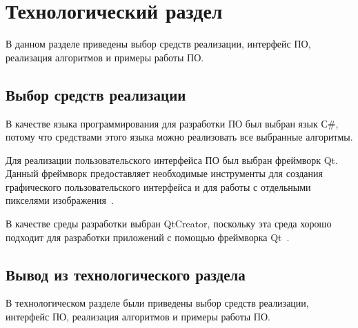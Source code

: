 \chapter{Технологический раздел}
В данном разделе приведены выбор средств реализации, интерфейс ПО, реализация алгоритмов и примеры работы ПО.

\section{Выбор средств реализации}
В качестве языка программирования для разработки ПО был выбран язык С\#, потому что средствами этого языка можно реализовать все выбранные алгоритмы.

Для реализации пользовательского интерфейса ПО был выбран фреймворк Qt. Данный фреймворк предоставляет необходимые инструменты для создания графического пользовательского интерфейса и для работы с отдельными пикселями изображения~\cite{src_qt}.

В качестве среды разработки выбран QtCreator, поскольку эта среда хорошо подходит для разработки приложений с помощью фреймворка Qt~\cite{src_qt}.


\section{Вывод из технологического раздела}
В технологическом разделе были приведены выбор средств реализации, интерфейс ПО, реализация алгоритмов и примеры работы ПО.